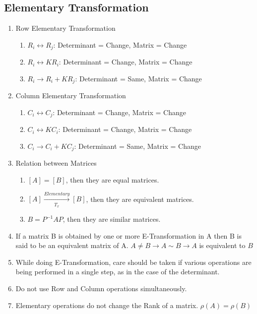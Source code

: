 \subsection{Elementary Transformation}

\begin{enumerate}
    \item Row Elementary Transformation
    \begin{enumerate}
        \item $R_i \leftrightarrow R_j$: Determinant = Change, Matrix = Change

        \item $R_i \leftrightarrow KR_i$: Determinant = Change, Matrix = Change

        \item $R_i \xrightarrow{} R_i + KR_j$: Determinant = Same, Matrix = Change
    \end{enumerate}

    \item Column Elementary Transformation
    \begin{enumerate}
        \item $C_i \leftrightarrow C_j$: Determinant = Change, Matrix = Change

        \item $C_i \leftrightarrow KC_i$: Determinant = Change, Matrix = Change

        \item $C_i \xrightarrow{} C_i + KC_j$: Determinant = Same, Matrix = Change
    \end{enumerate}

    \item Relation between Matrices
    \begin{enumerate}
        \item $[A] = [B]$, then they are equal matrices.

        \item $[A] \xrightarrow[T_x]{Elementary} [B]$, then they are equivalent matrices.

        \item $B = P^{-1}AP$, then they are similar matrices.
    \end{enumerate}

    \item If a matrix B is obtained by one or more E-Transformation in A then B is said to be an equivalent matrix of A.
    $A \neq B \longrightarrow A \sim B \longrightarrow A$ is equivalent to $B$

    \item While doing E-Transformation, care should be taken if various operations are being performed in a single step, as in the case of the determinant.

    \item Do not use Row and Column operations simultaneously.

    \item Elementary operations do not change the Rank of a matrix. $\rho(A) = \rho(B)$
\end{enumerate}

